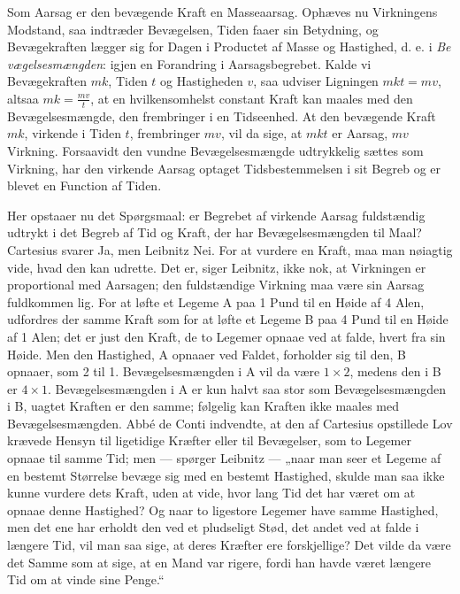 \documentclass[12pt,a4paper]{book}
\begin{document}
Som Aarsag er den bevægende Kraft en Masseaarsag. Ophæves nu Virkningens
Modstand, saa indtræder Bevægelsen, Tiden faaer sin Betydning, og
Bevægekraften lægger sig for Dagen i Productet af Masse og Hastighed,
d. e. i \emph{Be\-%
vægelsesmængden}: igjen en Forandring i Aarsagsbegrebet. Kalde vi
Bevægekraften $mk$, Tiden $t$ og Hastigheden $v$, saa udviser Ligningen
$mkt = mv$, altsaa $mk = \frac{mv}{t}$, at en hvilkensomhelst constant
Kraft kan maales med den Bevægelsesmængde, den frembringer i en
Tidseenhed. At den bevægende Kraft $mk$, virkende i Tiden $t$,
frembringer $mv$, vil da sige, at $mkt$ er Aarsag, $mv$ Virkning.
Forsaavidt den vundne Bevægelsesmængde udtrykkelig sættes som Virkning,
har den virkende Aarsag optaget Tidsbestemmelsen i sit Begreb og er
blevet en Function af Tiden.

Her opstaaer nu det Spørgsmaal: er Begrebet af virkende Aarsag
fuldstændig udtrykt i det Begreb af Tid og Kraft, der har
Bevægelsesmængden til Maal? Cartesius svarer Ja, men Leibnitz Nei. For at
vurdere en Kraft, maa man nøiagtig vide, hvad den kan udrette. Det er,
siger Leibnitz, ikke nok, at Virkningen er proportional med Aarsagen; den
fuldstændige Virkning maa være sin
Aarsag fuldkommen lig. For at løfte et Legeme A paa 1 Pund til en Høide
af 4 Alen, udfordres der samme Kraft som for at løfte et Legeme B paa 4
Pund til en Høide af 1 Alen; det er just den Kraft, de to Legemer opnaae
ved at falde, hvert fra sin Høide. Men den Hastighed, A opnaaer ved
Faldet, forholder sig til den, B opnaaer, som 2 til 1.
Bevægelsesmængden i A vil da være $1 \times 2$, medens den i B er
$4 \times 1$. Bevægelsesmængden i A er kun halvt saa stor som
Bevægelsesmængden i B, uagtet Kraften er den samme; følgelig kan Kraften
ikke maales med Bevægelsesmængden. Abbé de Conti indvendte, at den af
Cartesius opstillede Lov krævede Hensyn til ligetidige Kræfter eller til
Bevægelser, som to Legemer opnaae til samme Tid; men --- spørger Leibnitz
--- „naar man seer et Legeme af en bestemt Størrelse bevæge sig med en
bestemt Hastighed, skulde man saa ikke kunne vurdere dets Kraft, uden at
vide, hvor lang Tid det har været om at opnaae denne Hastighed? Og naar
to ligestore Legemer have samme Hastighed, men det ene har erholdt den
ved et pludseligt Stød, det andet ved at falde i længere Tid, vil man saa
sige, at deres Kræfter ere forskjellige? Det vilde da være det Samme som
at sige, at en Mand var rigere, fordi han havde været længere Tid om at
vinde sine Penge.“
\end{document}
